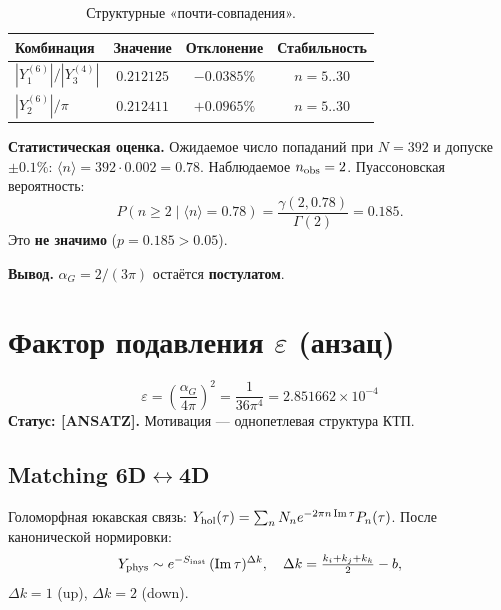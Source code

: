 \documentclass[12pt,a4paper]{article}
\numberwithin{equation}{section}
\begin{document}
\begin{table}[H]
\centering
\caption{Структурные «почти-совпадения».}
\label{tab:alpha-coincidences}
\begin{tabular}{lccc}
\toprule
Комбинация & Значение & Отклонение & Стабильность \\
\midrule
$|Y^{(6)}_1|/|Y^{(4)}_3|$ & $0.212125$ & $\mathbf{-0.0385\%}$ & $n = 5..30$ \\
$|Y^{(6)}_2|/\pi$         & $0.212411$ & $\mathbf{+0.0965\%}$ & $n = 5..30$ \\
\bottomrule
\end{tabular}
\end{table}

\textbf{Статистическая оценка.} Ожидаемое число попаданий при
$N = 392$ и допуске $\pm 0.1\%$: $\langle n\rangle = 392 \cdot 0.002 = 0.78$.
Наблюдаемое $n_{\rm obs} = 2$. Пуассоновская вероятность:
\begin{equation}
P(n \ge 2 \mid \langle n\rangle = 0.78) = \frac{\gamma(2, 0.78)}{\Gamma(2)} = 0.185.
\end{equation}
Это \textbf{не значимо} ($p = 0.185 > 0.05$).

\textbf{Вывод.} $\alpha_G = 2/(3\pi)$ остаётся \textbf{постулатом}.

\section{Фактор подавления $\varepsilon$ (анзац)}
\label{sec:eps}

\begin{equation}
\boxed{\;\varepsilon = \left(\frac{\alpha_G}{4\pi}\right)^2
= \frac{1}{36\pi^4} = 2.851662\times10^{-4}\;}
\label{eq:eps}
\end{equation}
\textbf{Статус: [ANSATZ].} Мотивация --- однопетлевая структура КТП.

\subsection{Matching 6D$\leftrightarrow$4D}

Голоморфная юкавская связь:
$Y_{\rm hol}(\tau) = \sum_n N_n e^{-2\pi n\,{\rm Im}\,\tau} P_n(\tau)$.
После канонической нормировки:
\begin{equation}
Y_{\rm phys} \sim e^{-S_{\rm inst}}\,({\rm Im}\,\tau)^{\Delta k},
\quad \Delta k = \tfrac{k_i+k_j+k_k}{2} - b,
\end{equation}
$\Delta k = 1$ (up), $\Delta k = 2$ (down).
\end{document}
